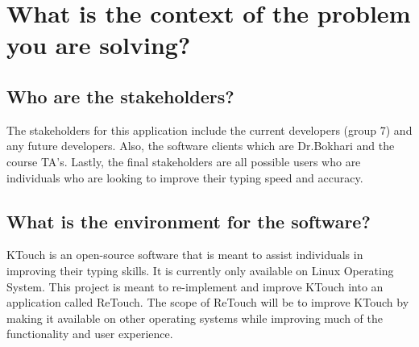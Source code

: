 \documentclass[11pt, oneside]{article}
\begin{document}
\section{What is the context of the problem you are solving?}

\subsection{Who are the stakeholders?}

The stakeholders for this application include the current developers (group 7) and any future developers. Also, the software clients which are Dr.Bokhari and the course TA's. Lastly, the final stakeholders are all possible users who are individuals who are looking to improve their typing speed and accuracy. 

 
\subsection{What is the environment for the software?}

KTouch is an open-source software that is meant to assist individuals in improving their typing skills. It is currently only available on Linux Operating System. This project is meant to re-implement and improve KTouch into an application called ReTouch. The scope of ReTouch will be to improve KTouch by making it available on other operating systems while improving much of the functionality and user experience. 
\end{document}
